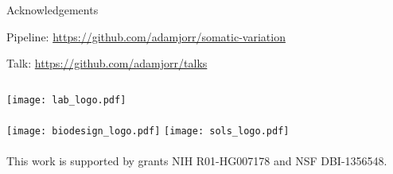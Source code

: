 \documentclass{beamer}
\begin{document}
\begin{frame}{Acknowledgements}

Pipeline:  \url{https://github.com/adamjorr/somatic-variation}

Talk:  \url{https://github.com/adamjorr/talks}

\vfill

\begin{columns}
	\texttt{[image: lab\_logo.pdf]}
	\\~\\
	\texttt{[image: biodesign\_logo.pdf]}
	\texttt{[image: sols\_logo.pdf]}
	\\~\\
	This work is supported by grants NIH R01-HG007178 and NSF DBI-1356548.
\end{columns}

\end{frame}

\end{document}

